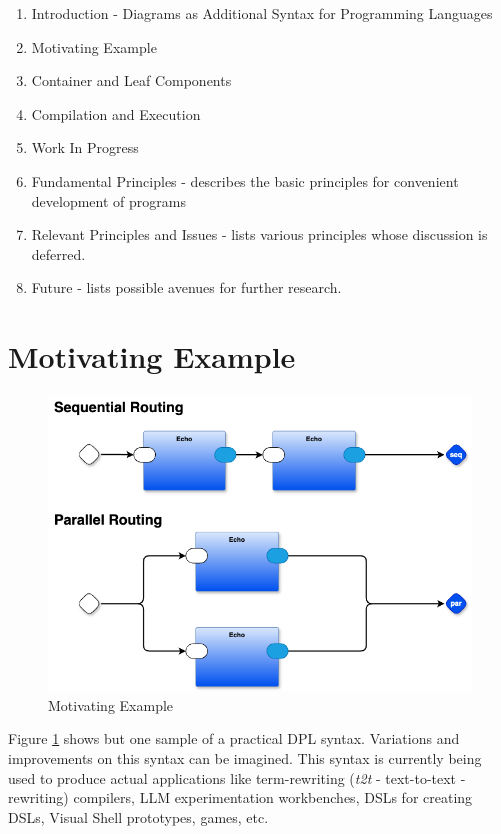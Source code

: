 \documentclass[10pt,anonymous,review]{acmart}
\begin{document}
\begin{enumerate}
\item Introduction - Diagrams as Additional Syntax for Programming
Languages

\item Motivating Example

\item Container and Leaf Components

\item Compilation and Execution

\item Work In Progress

\item Fundamental Principles - describes the basic principles
for convenient development of programs

\item Relevant Principles and Issues - lists various
principles whose discussion is deferred.

\item Future - lists possible avenues for further research.

\end{enumerate}

\section{Motivating Example}

  \begin{figure}[h]
    \centering
    \includegraphics[width=0.8\linewidth]{./media/HelloWorld0D.png}
    \caption{Motivating Example}
    \label{mot}
  \end{figure}

Figure \ref{mot} shows but one sample of a practical DPL syntax. Variations and
improvements on this syntax can be imagined. This syntax is currently being used
to produce actual applications like term-rewriting (\emph{t2t} -
text-to-text - rewriting) compilers, LLM experimentation workbenches, DSLs for creating DSLs,
Visual Shell prototypes, games, etc.
\end{document}
